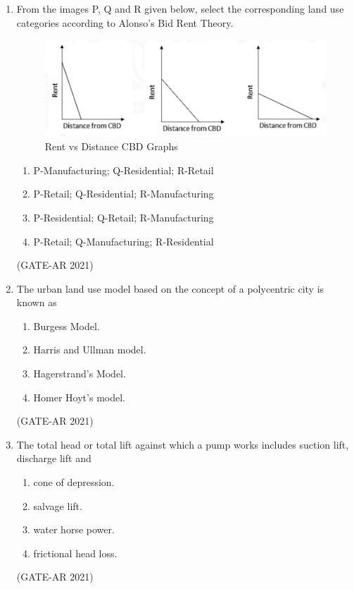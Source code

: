 \documentclass[a4paper,10pt]{article}
\begin{document}
\begin{enumerate}
    \item From the images P, Q and R given below, select the corresponding land use categories according to Alonso's Bid Rent Theory. \\
    \begin{figure}[h!]
    \centering
    \includegraphics[width=0.5\columnwidth]{figs/07.jpg}
    \caption{Rent vs Distance CBD Graphs}
    \label{fig:Img07}
    \end{figure}
    \begin{enumerate}
        \item P-Manufacturing; Q-Residential; R-Retail
        \item P-Retail; Q-Residential; R-Manufacturing
        \item P-Residential; Q-Retail; R-Manufacturing
        \item P-Retail; Q-Manufacturing; R-Residential
    \end{enumerate}
    \hfill (GATE-AR 2021)

    \item The urban land use model based on the concept of a polycentric city is known as 
    \begin{multicols}{2}
    \begin{enumerate}
        \item Burgess Model.
        \item Harris and Ullman model.
        \item Hagerstrand's Model.
        \item Homer Hoyt's model.
    \end{enumerate}
    \end{multicols}
    \hfill (GATE-AR 2021)

    \item The total head or total lift against which a pump works includes suction lift, discharge lift and 
    \begin{multicols}{2}
    \begin{enumerate}
        \item cone of depression.
        \item salvage lift.
        \item water horse power.
        \item frictional head loss.
    \end{enumerate}
    \end{multicols}
    \hfill (GATE-AR 2021)


\end{enumerate}
\end{document}
